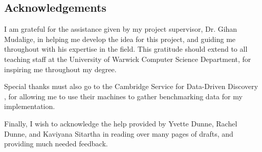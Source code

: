
\vspace*{\fill}
\begin{adjustwidth}{55pt}{55pt}
\section*{Acknowledgements}
I am grateful for the assistance given by my project supervisor, Dr. Gihan Mudalige, in helping me develop the idea for this project, and guiding me throughout with his expertise in the field. This gratitude should extend to all teaching staff at the University of Warwick Computer Science Department, for inspiring me throughout my degree.
\par Special thanks must also go to the Cambridge Service for Data-Driven Discovery , for allowing me to use their machines to gather benchmarking data for my implementation.
\par Finally, I wish to acknowledge the help provided by Yvette Dunne, Rachel Dunne, and Kaviyana Sitartha in reading over many pages of drafts, and providing much needed feedback.
\end{adjustwidth}
\vspace*{\fill}
